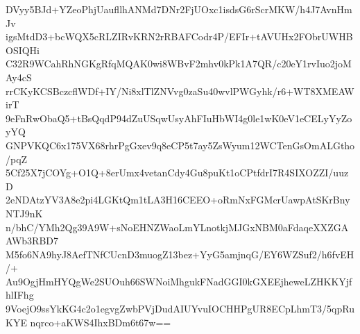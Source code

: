 DVyy5BJd+YZeoPhjUaufllhANMd7DNr2FjUOxc1isdsG6rScrMKW/h4J7AvnHmJv
igsMtdD3+bcWQX5cRLZIRvKRN2rRBAFCodr4P/EFIr+tAVUHx2FObrUWHBOSIQHi
C32R9WCahRhNGKgRfqMQAK0wi8WBvF2mhv0kPk1A7QR/c20eY1rvIuo2joMAy4cS
rrCKyKCSBczcflWDf+IY/Ni8xlTlZNVvg0zaSu40wvlPWGyhk/r6+WT8XMEAWirT
9eFnRwObaQ5+tBsQqdP94dZuUSqwUsyAhFIuHbWI4g0le1wK0eV1eCELyYyZoyYQ
GNPVKQC6x175VX68rhrPgGxev9q8eCP5t7ay5ZsWyum12WCTenGsOmALGtho/pqZ
5Cf25X7jCOYg+O1Q+8erUmx4vetanCdy4Gu8puKt1oCPtfdrI7R4SIXOZZI/uuzD
2eNDAtzYV3A8e2pi4LGKtQm1tLA3H16CEEO+oRmNxFGMcrUawpAtSKrBnyNTJ9nK
n/bhC/YMh2Qg39A9W+sNoEHNZWaoLmYLnotkjMJGxNBM0aFdaqeXXZGAAWb3RBD7
M5fo6NA9hyJ8AefTNfCUcnD3muogZ13bez+YyG5amjnqG/EY6WZSuf2/h6fvEH/+
Au9OgjHmHYQgWe2SUOuh66SWNoiMhgukFNadGGI0kGXEEjheweLZHKKYjfhlIFhg
9VoejO9ssYkKG4c2o1egvgZwbPVjDudAIUYvuIOCHHPgUR8ECpLhmT3/5qpRuKYE
nqrco+aKWS4IhxBDm6t67w==
